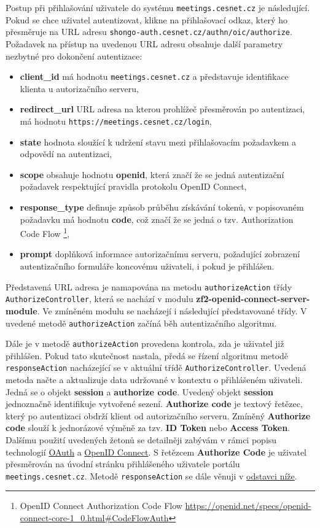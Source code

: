 \documentclass[
  printed, %
  twoside, %
  table,   %
  nolof,     %
  nolot,     %
]{fithesis3}
\begin{document}
Postup při přihlašování uživatele do systému \texttt{meetings.cesnet.cz} je následující. Pokud se chce uživatel autentizovat, klikne na přihlašovací odkaz, který ho přesměruje na URL adresu \texttt{shongo-auth.cesnet.cz/authn/oic/authorize}. Požadavek na přístup na uvedenou URL adresu obsahuje další parametry nezbytné pro dokončení autentizace:
\label{shongo:state}
\begin{itemize}
    \item \textbf{client\_id} má hodnotu \texttt{meetings.cesnet.cz} a představuje identifikace klienta u autorizačního serveru,
    \item \textbf{redirect\_url} URL adresa na kterou prohlížeč přesměrován po autentizaci, má hodnotu \texttt{https://meetings.cesnet.cz/login}, 
    \item \textbf{state} hodnota sloužící k udržení stavu mezi přihlašovacím požadavkem a odpovědí na autentizaci, 
    \item \textbf{scope} obsahuje hodnotu \textbf{openid}, která značí že se jedná autentizační požadavek respektující pravidla protokolu OpenID Connect,
    \item \textbf{response\_type} definuje způsob průběhu získávání tokenů, v popisovaném požadavku má hodnotu \textbf{code}, což značí že se jedná o tzv. Authorization Code Flow \footnote{OpenID Connect Authorization Code Flow \url{https://openid.net/specs/openid-connect-core-1_0.html\#CodeFlowAuth}},
    \item \textbf{prompt} doplňková informace autorizačnímu serveru, požadující zobrazení autentizačního formuláře koncovému uživateli, i pokud je přihlášen. 
\end{itemize}


Představená URL adresa je namapována na metodu \texttt{authorizeAction} třídy \texttt{AuthorizeController}, která se nachází v modulu \textbf{zf2-openid-connect-server-module}. Ve zmíněném modulu  se nacházejí i následující představované třídy. V uvedené metodě \texttt{authorizeAction} začíná běh autentizačního algoritmu. \par 

Dále je v metodě \texttt{authorizeAction} provedena kontrola, zda je uživatel již přihlášen. Pokud tato skutečnost nastala, předá se řízení algoritmu metodě \texttt{responseAction} nacházející se v aktuální třídě \texttt{AuthorizeController}. Uvedená metoda načte a  aktualizuje data udržované v kontextu o přihlášeném uživateli. Jedná se o objekt \textbf{session} a \textbf{authorize code}. Uvedený objekt \textbf{session} jednoznačně identifikuje vytvořené sezení. \textbf{Authorize code} je textový řetězec, který po autentizaci obdrží klient od autorizačního serveru. Zmíněný \textbf{Authorize code} slouží k jednorázové výměně za tzv. \textbf{ID Token} nebo \textbf{Access Token}. Dalšímu použití uvedených žetonů se detailněji zabývám v rámci popisu technologií \hyperref[sec:oauth]{OAuth} a \hyperref[sec:oidc]{OpenID Connect}. S řetězcem \textbf{Authorize Code} je uživatel přesměrován na úvodní stránku přihlášeného uživatele portálu \texttt{meetings.cesnet.cz}. Metodě \texttt{responseAction} se dále věnuji v \hyperref[sec:responseAction]{odstavci níže}. \par 
\end{document}
